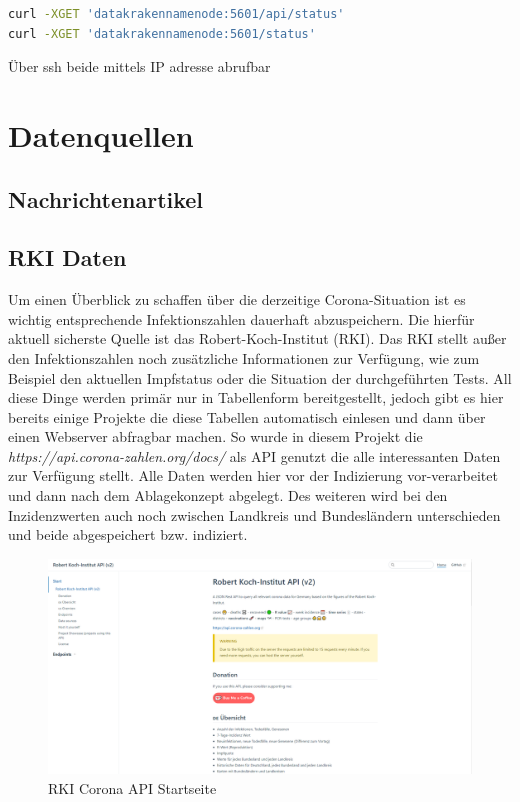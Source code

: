 \documentclass[12pt,oneside,a4paper,parskip]{scrbook}
\begin{document}
\begin{lstlisting}[caption=Statusabfrage Kibana,label=statuskibana,language=bash]
curl -XGET 'datakrakennamenode:5601/api/status'
curl -XGET 'datakrakennamenode:5601/status'
\end{lstlisting}

Über ssh beide mittels IP adresse abrufbar

\chapter{Datenquellen}
\section{Nachrichtenartikel}
\section{RKI Daten}
Um einen \"Uberblick zu schaffen \"uber die derzeitige Corona-Situation ist es wichtig entsprechende Infektionszahlen dauerhaft abzuspeichern. Die hierf\"ur aktuell sicherste Quelle ist das Robert-Koch-Institut (RKI). Das RKI stellt außer den Infektionszahlen noch zus\"atzliche Informationen zur Verf\"ugung, wie zum Beispiel den aktuellen Impfstatus oder die Situation der durchgef\"uhrten Tests.\newline
All diese Dinge werden prim\"ar nur in Tabellenform bereitgestellt, jedoch gibt es hier bereits einige Projekte die diese Tabellen automatisch einlesen und dann \"uber einen Webserver abfragbar machen. So wurde in diesem Projekt die \textit{https://api.corona-zahlen.org/docs/} als API genutzt die alle interessanten Daten zur Verf\"ugung stellt. \newline
Alle Daten werden hier vor der Indizierung vor-verarbeitet und dann nach dem Ablagekonzept abgelegt.
Des weiteren wird bei den Inzidenzwerten auch noch zwischen Landkreis und Bundesl\"andern unterschieden und beide abgespeichert bzw. indiziert.
\begin{figure}[H]
	\centering
	\includegraphics[scale=0.4]{rkiapiOverview.png}
	\captionsetup{justification=centering}
	\caption{RKI Corona API Startseite}
	\label{pic:rkiapiOverview}
\end{figure}
\end{document}
